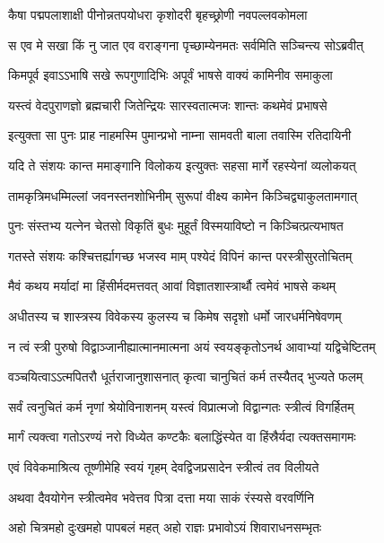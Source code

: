 \twolineshloka
{कैषा पद्मपलाशाक्षी पीनोन्नतपयोधरा}
{कृशोदरी बृहच्छ्रोणी नवपल्लवकोमला} %

\twolineshloka
{स एव मे सखा किं नु जात एव वराङ्गना}
{पृच्छाम्येनमतः सर्वमिति सञ्चिन्त्य सोऽब्रवीत्} %

\twolineshloka
{किमपूर्व इवाऽऽभाषि सखे रूपगुणादिभिः}
{अपूर्वं भाषसे वाक्यं कामिनीव समाकुला} %

\twolineshloka
{यस्त्वं वेदपुराणज्ञो ब्रह्मचारी जितेन्द्रियः}
{सारस्वतात्मजः शान्तः कथमेवं प्रभाषसे} %

\twolineshloka
{इत्युक्ता सा पुनः प्राह नाहमस्मि पुमान्प्रभो}
{नाम्ना सामवती बाला तवास्मि रतिदायिनी} %

\twolineshloka
{यदि ते संशयः कान्त ममाङ्गानि विलोकय}
{इत्युक्तः सहसा मार्गे रहस्येनां व्यलोकयत्} %

\twolineshloka
{तामकृत्रिमधम्मिल्लां जवनस्तनशोभिनीम्}
{सुरूपां वीक्ष्य कामेन किञ्चिद्व्याकुलतामगात्} %

\twolineshloka
{पुनः संस्तभ्य यत्नेन चेतसो विकृतिं बुधः}
{मुहूर्तं विस्मयाविष्टो न किञ्चित्प्रत्यभाषत} %

\twolineshloka
{गतस्ते संशयः कश्चित्तर्ह्यागच्छ भजस्व माम्}
{पश्येदं विपिनं कान्त परस्त्रीसुरतोचितम्} %

\twolineshloka
{मैवं कथय मर्यादां मा हिंसीर्मदमत्तवत्}
{आवां विज्ञातशास्त्रार्थौ त्वमेवं भाषसे कथम्} %

\twolineshloka
{अधीतस्य च शास्त्रस्य विवेकस्य कुलस्य च}
{किमेष सदृशो धर्मो जारधर्मनिषेवणम्} %

\twolineshloka
{न त्वं स्त्री पुरुषो विद्वाञ्जानीह्यात्मानमात्मना}
{अयं स्वयङ्कृतोऽनर्थ आवाभ्यां यद्विचेष्टितम्} %

\twolineshloka
{वञ्चयित्वाऽऽत्मपितरौ धूर्तराजानुशासनात्}
{कृत्वा चानुचितं कर्म तस्यैतद् भुज्यते फलम्} %

\twolineshloka
{सर्वं त्वनुचितं कर्म नृणां श्रेयोविनाशनम्}
{यस्त्वं विप्रात्मजो विद्वान्गतः स्त्रीत्वं विगर्हितम्} %

\twolineshloka
{मार्गं त्यक्त्वा गतोऽरण्यं नरो विध्येत कण्टकैः}
{बलाद्धिंस्येत वा हिंस्रैर्यदा त्यक्तसमागमः} %

\twolineshloka
{एवं विवेकमाश्रित्य तूष्णीमेहि स्वयं गृहम्}
{देवद्विजप्रसादेन स्त्रीत्वं तव विलीयते} %

\twolineshloka
{अथवा दैवयोगेन स्त्रीत्वमेव भवेत्तव}
{पित्रा दत्ता मया साकं रंस्यसे वरवर्णिनि} %

\twolineshloka
{अहो चित्रमहो दुःखमहो पापबलं महत्}
{अहो राज्ञः प्रभावोऽयं शिवाराधनसम्भृतः} %

